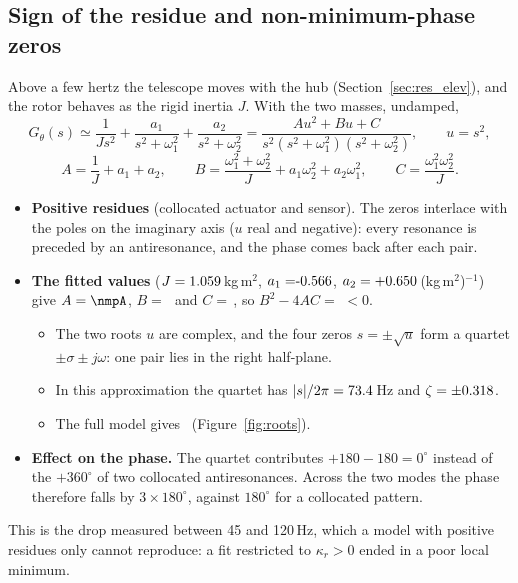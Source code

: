 \documentclass[10pt,a4paper]{article}
\numberwithin{equation}{section}
\begin{document}
\subsection{Sign of the residue and non-minimum-phase zeros}\label{sec:nmp}
Above a few hertz the telescope moves with the hub (Section~\ref{sec:res_elev}), and the rotor behaves as the rigid inertia $J$. With the two masses, undamped,
\begin{equation}
G_\theta(s)\simeq\frac{1}{Js^2}+\frac{a_1}{s^2+\omega_1^2}+\frac{a_2}{s^2+\omega_2^2}
=\frac{A u^2+Bu+C}{s^2(s^2+\omega_1^2)(s^2+\omega_2^2)},\qquad u=s^2,
\end{equation}
\begin{equation}
A=\frac1J+a_1+a_2,\qquad B=\frac{\omega_1^2+\omega_2^2}{J}+a_1\omega_2^2+a_2\omega_1^2,\qquad C=\frac{\omega_1^2\omega_2^2}{J} .
\end{equation}
\begin{itemize}
\item \textbf{Positive residues} (collocated actuator and sensor). The zeros interlace with the poles on the imaginary axis ($u$ real and negative): every resonance is preceded by an antiresonance, and the phase comes back after each pair.
\item \textbf{The fitted values} ($J=1.059$\,kg\,m$^2$, $a_1=\aMassI$, $a_2=+0.650$\,(kg\,m$^2$)$^{-1}$) give $A=\nmpA$, $B=$\,\nmpB\ and $C=$\,\nmpC, so $B^2-4AC=$\,\nmpDisc\,$<0$.
  \begin{itemize}
  \item The two roots $u$ are complex, and the four zeros $s=\pm\sqrt u$ form a quartet $\pm\sigma\pm j\omega$: one pair lies in the right half-plane.
  \item In this approximation the quartet has $|s|/2\pi=73.4$\,Hz and $\zeta=\pm0.318$.
  \item The full model gives \zerosP\ (Figure~\ref{fig:roots}).
  \end{itemize}
\item \textbf{Effect on the phase.} The quartet contributes $+180-180=0^\circ$ instead of the $+360^\circ$ of two collocated antiresonances. Across the two modes the phase therefore falls by $3\times180^\circ$, against $180^\circ$ for a collocated pattern.
\end{itemize}
This is the drop measured between 45 and 120\,Hz, which a model with positive residues only cannot reproduce: a fit restricted to $\kappa_r>0$ ended in a poor local minimum.
\end{document}
